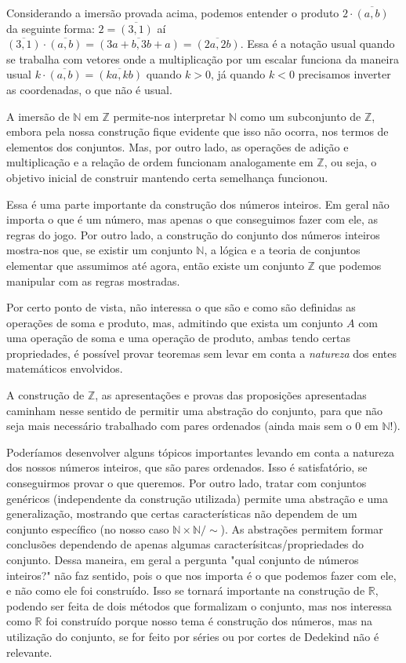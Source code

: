 \documentclass[../main.tex]{subfiles}
\begin{document}
\begin{ex}\label{int-ex-imersaoProduto}
    Considerando a imersão provada acima, podemos entender o produto $2 \cdot \overline{(a,b)}$ da seguinte forma:
    $2 = \overline{(3,1)}$ aí $\overline{(3,1)} \cdot \overline{(a,b)} = \overline{(3a+b,3b+a)} = \overline{(2a,2b)}$.
    Essa é a notação usual quando se trabalha com vetores onde a multiplicação por um escalar funciona da maneira usual 
    $k \cdot \overline{(a,b)} = \overline{(ka,kb)}$ quando $k > 0$, já quando $k < 0$ precisamos inverter as coordenadas, o que não é usual.
\end{ex}
A imersão de $\mathbb{N}$ em $\mathbb{Z}$ permite-nos interpretar $\mathbb{N}$ como um subconjunto de $\mathbb{Z}$, embora pela nossa construção fique evidente que isso não ocorra, nos termos de elementos dos conjuntos. Mas, por outro lado, as operações de adição e multiplicação e a relação de ordem funcionam analogamente em $\mathbb{Z}$, ou seja, o objetivo inicial de construir mantendo certa semelhança funcionou.

Essa é uma parte importante da construção dos números inteiros. Em geral não importa o que é um número, mas apenas o que conseguimos fazer com ele, as regras do jogo. Por outro lado, a construção do conjunto dos números inteiros mostra-nos que, se existir um conjunto $\mathbb{N}$, a lógica e a teoria de conjuntos elementar que assumimos até agora, então existe um conjunto $\mathbb{Z}$ que podemos manipular com as regras mostradas.

Por certo ponto de vista, não interessa o que são e como são definidas as operações de soma e produto, mas, admitindo que exista um conjunto $A$ com uma operação de soma e uma operação de produto, ambas tendo certas propriedades, é possível provar teoremas sem levar em conta a \emph{natureza} dos entes matemáticos envolvidos.

A construção de $\mathbb{Z}$, as apresentações e provas das proposições apresentadas caminham nesse sentido de permitir uma abstração do conjunto, para que não seja mais necessário trabalhado com pares ordenados (ainda mais sem o $0$ em $\mathbb{N}$!).

Poderíamos desenvolver alguns tópicos importantes levando em conta a natureza dos nossos números inteiros, que são pares ordenados. Isso é satisfatório, se conseguirmos provar o que queremos. Por outro lado, tratar com conjuntos genéricos (independente da construção utilizada) permite uma abstração e uma generalização, mostrando que certas características não dependem de um conjunto específico (no nosso caso $\mathbb{N} \times \mathbb{N} / \sim$). As abstrações permitem formar conclusões dependendo de apenas algumas caracterísitcas/propriedades do conjunto. Dessa maneira, em geral a pergunta "qual conjunto de números inteiros?" não faz sentido, pois o que nos importa é o que podemos fazer com ele, e não como ele foi construído. Isso se tornará importante na construção de $\mathbb{R}$, podendo ser feita de dois métodos que formalizam o conjunto, mas nos interessa como $\mathbb{R}$ foi construído porque nosso tema é construção dos números, mas na utilização do conjunto, se for feito por séries ou por cortes de Dedekind não é relevante. 
\end{document}
